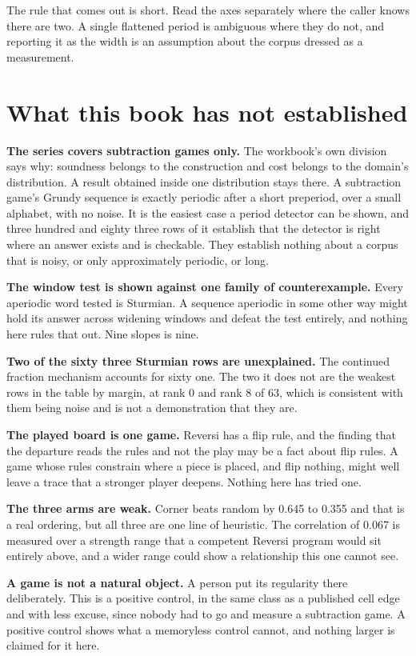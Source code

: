 The rule that comes out is short. Read the axes separately where the caller knows there are two. A
single flattened period is ambiguous where they do not, and reporting it as the width is an
assumption about the corpus dressed as a measurement.

\section{What this book has not established}

\textbf{The series covers subtraction games only.} The workbook's own division says why: soundness
belongs to the construction and cost belongs to the domain's distribution. A result obtained inside
one distribution stays there. A subtraction game's Grundy sequence is exactly periodic after a short
preperiod, over a small alphabet, with no noise. It is the easiest case a period detector can be
shown, and three hundred and eighty three rows of it establish that the
detector is right where an answer exists and is checkable. They establish nothing about a corpus
that is noisy, or only approximately periodic, or long.

\textbf{The window test is shown against one family of counterexample.} Every aperiodic word tested
is Sturmian. A sequence aperiodic in some other way might hold its answer across widening windows and
defeat the test entirely, and nothing here rules that out. Nine slopes is nine.

\textbf{Two of the sixty three Sturmian rows are unexplained.} The continued fraction mechanism
accounts for sixty one. The two it does not are the weakest rows in the table by margin, at rank 0
and rank 8 of 63, which is consistent with them being noise and is not a demonstration that they are.

\textbf{The played board is one game.} Reversi has a flip rule, and the finding that the departure
reads the rules and not the play may be a fact about flip rules. A game whose rules constrain where
a piece is placed, and flip nothing, might well leave a trace that a stronger player deepens. Nothing
here has tried one.

\textbf{The three arms are weak.} Corner beats random by 0.645 to 0.355 and that is a real ordering,
but all three are one line of heuristic. The correlation of 0.067 is measured over a strength range
that a competent Reversi program would sit entirely above, and a wider range could show a
relationship this one cannot see.

\textbf{A game is not a natural object.} A person put its regularity there deliberately. This is a
positive control, in the same class as a published cell edge and with less excuse, since nobody had
to go and measure a subtraction game. A positive control shows what a memoryless control cannot, and
nothing larger is claimed for it here.

